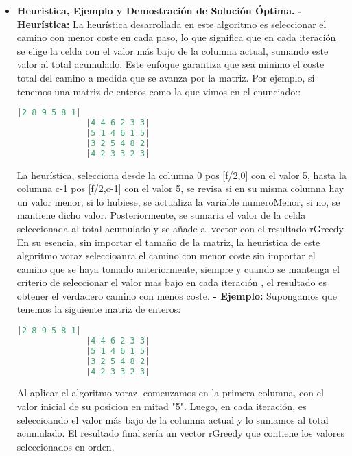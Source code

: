 \documentclass[12pt, letterpaper]{article}
\begin{document}
\begin{itemize}
  \newpage %
        \item \textbf{Heuristica, Ejemplo y Demostración de Solución Óptima.}
          \subitem\textbf{- Heurística:}
            La heurística desarrollada en este algoritmo es seleccionar el camino con menor coste en cada paso, lo que significa que en cada iteración se elige la celda con el valor más bajo 
            de la columna actual, sumando este valor al total acumulado. Este enfoque garantiza que sea minimo el coste total del camino a medida que se avanza por la matriz.
            \newline
            Por ejemplo, si tenemos una matriz de enteros como la que vimos en el enunciado::
            \begin{lstlisting}[language=C++]
              |2 8 9 5 8 1|
              |4 4 6 2 3 3|
              |5 1 4 6 1 5|
              |3 2 5 4 8 2|
              |4 2 3 3 2 3|
            \end{lstlisting}
            La heurística, selecciona desde la columna 0 pos [f/2,0] con el valor 5, hasta la columna c-1 pos [f/2,c-1] con el valor 5, se revisa si en su misma columna hay un valor menor, 
            si lo hubiese, se actualiza la variable numeroMenor, si no, se mantiene dicho valor. Posteriormente, se sumaria el valor de la celda seleccionada al total acumulado y se añade al vector con el resultado rGreedy.
            \newline
            En su esencia, sin importar el tamaño de la matriz, la heuristica de este algoritmo voraz seleccioanra el camino con menor coste sin importar el camino que se haya tomado anteriormente, siempre y cuando se mantenga el criterio de seleccionar el valor mas bajo en cada iteración
            , el resultado es obtener el verdadero camino con menos coste.
  \newpage %
          \subitem\textbf{- Ejemplo:}
            Supongamos que tenemos la siguiente matriz de enteros:
            \begin{lstlisting}[language=C++]
              |2 8 9 5 8 1|
              |4 4 6 2 3 3|
              |5 1 4 6 1 5|
              |3 2 5 4 8 2|
              |4 2 3 3 2 3|
            \end{lstlisting}
            Al aplicar el algoritmo voraz, comenzamos en la primera columna, con el valor inicial de su posicion en mitad "5". 
            Luego, en cada iteración, es seleccioando el valor más bajo de la columna actual y lo sumamos al total acumulado. 
            El resultado final sería un vector rGreedy que contiene los valores seleccionados en orden.

\end{itemize}
\end{document}
